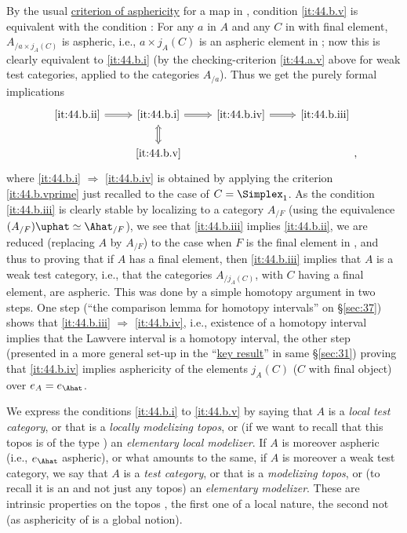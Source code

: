 By the usual \hyperref[lem:asphericitycriterion]{criterion of
  asphericity} for a map in \Cat, condition \ref{it:44.b.v} is
equivalent with the condition : For
any $a$ in $A$ and any $C$ in \Cat{} with final element, $A_{/a\times
  j_A(C)}$ is aspheric, i.e., $a\times j_A(C)$ is an aspheric element
in \Ahat; now this is clearly equivalent to \ref{it:44.b.i} (by the
checking-criterion \ref{it:44.a.v} above for weak test categories,
applied to the categories $A_{/a}$). Thus we get the purely formal
implications
\[\begin{tikzcd}[baseline=(O.base),math mode=false,arrows=Rightarrow]
  \ref{it:44.b.ii} \ar[r] & \ref{it:44.b.i}\ar[d,Leftrightarrow]
  \ar[r] & \ref{it:44.b.iv} \ar[r] & \ref{it:44.b.iii} \\
  & |[alias=O]| \ref{it:44.b.v} & &
\end{tikzcd},\]
where \ref{it:44.b.i} $\Rightarrow$ \ref{it:44.b.iv} is obtained by
applying the criterion \ref{it:44.b.vprime} just recalled to the case
of $C=\Simplex_1$. As the condition \ref{it:44.b.iii} is clearly stable
by localizing to a category $A_{/F}$ (using the equivalence
$(A_{/F})\uphat\simeq \Ahat_{/F}$), we see that \ref{it:44.b.iii}
implies \ref{it:44.b.ii}, we are reduced (replacing $A$ by $A_{/F}$)
to the case when $F$ is the final element in \Ahat, and thus to
proving that if $A$ has a final element, then \ref{it:44.b.iii}
implies that $A$ is a weak test category, i.e., that the categories
$A_{/j_A(C)}$, with $C$ having a final element, are aspheric. This was
done by a simple homotopy argument in two steps. One step (``the
comparison lemma for homotopy intervals'' on \S \ref{sec:37}) shows that \ref{it:44.b.iii} $\Rightarrow$
\ref{it:44.b.iv}, i.e., existence of a homotopy interval implies that
the Lawvere interval is a homotopy interval, the other step
(presented in a more general set-up in the
``\hyperref[thm:keyresult]{key result}'' in same \S \ref{sec:31}) proving that \ref{it:44.b.iv} implies
asphericity of the elements $j_A(C)$ ($C$ with final
object) over $e_A=e_\Ahat$.

We express the conditions \ref{it:44.b.i} to \ref{it:44.b.v} by saying
that $A$ is a \emph{local test category}, or that \Ahat{} is a
\emph{locally modelizing topos}, or (if we want to recall that this
topos is of the type \Ahat) an \emph{elementary local modelizer}. If
$A$ is moreover aspheric (i.e., $e_\Ahat$ aspheric), or what amounts
to the same, if $A$ is moreover a weak test category, we say that $A$
is a \emph{test category}, or that \Ahat{} is a \emph{modelizing
  topos}, or (to recall it is an \Ahat{} and not just any topos) an
\emph{elementary modelizer}. These are intrinsic properties on the
topos \Ahat, the first one of a local nature, the second not (as
asphericity of \Ahat{} is a global notion).


